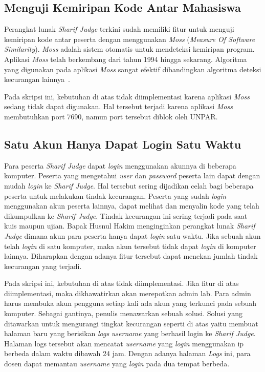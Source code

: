 \subsection{Menguji Kemiripan Kode Antar Mahasiswa}
Perangkat lunak \textit{Sharif Judge} terkini sudah memiliki fitur untuk menguji kemiripan kode antar peserta dengan menggunakan \textit{Moss} (\textit{Measure Of Software Similarity}). \textit{Moss} adalah sistem otomatis untuk mendeteksi kemiripan program. Aplikasi \textit{Moss} telah berkembang dari tahun 1994 hingga sekarang. Algoritma yang digunakan pada aplikasi \textit{Moss} sangat efektif dibandingkan algoritma deteksi kecurangan lainnya~\cite{aiken:10:moss}. 

Pada skripsi ini, kebutuhan di atas tidak diimplementasi karena aplikasi \textit{Moss} sedang tidak dapat digunakan. Hal tersebut terjadi karena aplikasi \textit{Moss} membutuhkan port 7690, namun port tersebut diblok oleh UNPAR.

\subsection{Satu Akun Hanya Dapat Login Satu Waktu}
Para peserta \textit{Sharif Judge} dapat \textit{login} menggunakan akunnya di beberapa komputer. Peserta yang mengetahui \textit{user} dan \textit{password} peserta lain dapat dengan mudah \textit{login} ke \textit{Sharif Judge}. Hal tersebut sering dijadikan celah bagi beberapa peserta untuk melakukan tindak kecurangan. Peserta yang sudah \textit{login} menggunakan akun peserta lainnya, dapat melihat dan menyalin kode yang telah dikumpulkan ke \textit{Sharif Judge}. Tindak kecurangan ini sering terjadi pada saat kuis maupun ujian. Bapak Husnul Hakim menginginkan perangkat lunak \textit{Sharif Judge} dimana akun para peserta hanya dapat \textit{login} satu waktu. Jika sebuah akun telah \textit{login} di satu komputer, maka akun tersebut tidak dapat \textit{login} di komputer lainnya. Diharapkan dengan adanya fitur tersebut dapat menekan jumlah tindak kecurangan yang terjadi. 

Pada skripsi ini, kebutuhan di atas tidak diimplementasi. Jika fitur di atas diimplementasi, maka dikhawatirkan akan merepotkan admin lab. Para admin harus membuka akun pengguna setiap kali ada akun yang terkunci pada sebuah komputer. Sebagai gantinya, penulis menawarkan sebuah solusi. Solusi yang ditawarkan untuk mengurangi tingkat kecurangan seperti di atas yaitu membuat halaman baru yang berisikan \textit{logs} \textit{username} yang berhasil login ke \textit{Sharif Judge}. Halaman logs tersebut akan mencatat \textit{username} yang \textit{login} menggunakan ip berbeda dalam waktu dibawah 24 jam. Dengan adanya halaman \textit{Logs} ini, para dosen dapat memantau \textit{username} yang \textit{login} pada dua tempat berbeda.

